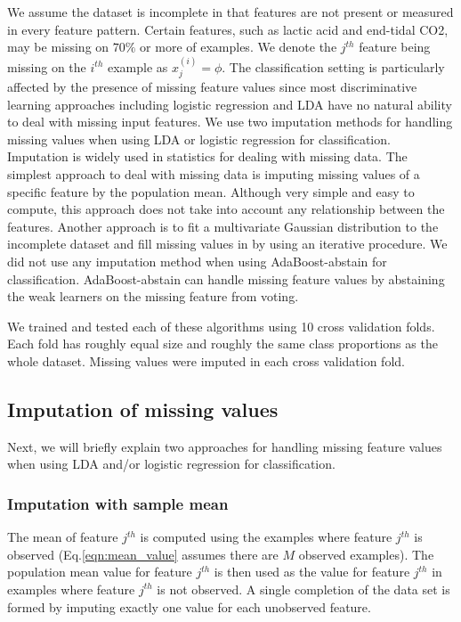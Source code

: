 \documentclass[
   technote
]{phildoc}
\newcommand{\eq}{Eq.}
\begin{document}
We assume the dataset is incomplete in that features are not present or measured in every feature pattern.  Certain features, such as lactic acid and end-tidal CO2, may be missing on $70\%$ or more of examples.  We denote the $j^{th}$ feature being missing on the $i^{th}$ example as $x^{(i)}_j=\phi$. The classification setting is particularly affected by the presence of missing feature values since most discriminative learning approaches including logistic regression and LDA have no natural ability to deal with missing input features. We use two imputation methods for handling missing values when using LDA or logistic regression for classification. Imputation is widely used in statistics for dealing with missing data. The simplest approach to deal with missing data is imputing missing values of a specific feature by the population mean. Although very simple and easy to compute, this approach does not take into account any relationship between the features. Another approach is to fit a multivariate Gaussian distribution to the incomplete dataset and fill missing values in by using an iterative procedure. We did not use any imputation method when using AdaBoost-abstain for classification. AdaBoost-abstain can handle missing feature values by abstaining the weak learners on the missing feature from voting. 

We trained and tested each of these algorithms using 10 cross validation folds. Each fold has roughly equal size and roughly the same class proportions as the whole dataset. Missing values were imputed in each cross validation fold.     


\subsection{Imputation of missing values}
Next, we will briefly explain two approaches for handling missing feature values when using LDA and/or logistic regression for classification. 

\subsubsection{Imputation with sample mean}
The mean of feature $j^{th}$ is computed using the examples where feature $j^{th}$ is observed (\eq{}\ref{eqn:mean_value} assumes there are $M$ observed examples). The population mean value for feature $j^{th}$ is then used as the value for feature $j^{th}$ in examples where feature $j^{th}$ is not observed. A single completion of the data set is formed by imputing exactly one value for each unobserved feature.   
\end{document}
